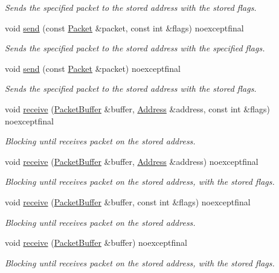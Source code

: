 \begin{DoxyCompactItemize}
\begin{DoxyCompactList}\small\item\em Sends the specified packet to the stored address with the stored flags. \end{DoxyCompactList}\item 
void \hyperlink{classtnnf_1_1_tcp_socket_adb529ca692b31b0154dc5d007d4129f9}{send} (const \hyperlink{classtnnf_1_1_packet}{Packet} \&packet, const int \&flags) noexceptfinal
\begin{DoxyCompactList}\small\item\em Sends the specified packet to the stored address with the specified flags. \end{DoxyCompactList}\item 
void \hyperlink{classtnnf_1_1_tcp_socket_a69f6fe0ca7e90ddfdcbd894056baed88}{send} (const \hyperlink{classtnnf_1_1_packet}{Packet} \&packet) noexceptfinal
\begin{DoxyCompactList}\small\item\em Sends the specified packet to the stored address with the stored flags. \end{DoxyCompactList}\item 
void \hyperlink{classtnnf_1_1_tcp_socket_ae713b6c9c9552af781989ec5382158d5}{receive} (\hyperlink{classtnnf_1_1_packet_buffer}{Packet\+Buffer} \&buffer, \hyperlink{classtnnf_1_1_address}{Address} \&address, const int \&flags) noexceptfinal
\begin{DoxyCompactList}\small\item\em Blocking until receives packet on the stored address. \end{DoxyCompactList}\item 
void \hyperlink{classtnnf_1_1_tcp_socket_aedbff0b4f5512742642a648712d93e7f}{receive} (\hyperlink{classtnnf_1_1_packet_buffer}{Packet\+Buffer} \&buffer, \hyperlink{classtnnf_1_1_address}{Address} \&address) noexceptfinal
\begin{DoxyCompactList}\small\item\em Blocking until receives packet on the stored address, with the stored flags. \end{DoxyCompactList}\item 
void \hyperlink{classtnnf_1_1_tcp_socket_a05fc003226288073314f52e3ee259119}{receive} (\hyperlink{classtnnf_1_1_packet_buffer}{Packet\+Buffer} \&buffer, const int \&flags) noexceptfinal
\begin{DoxyCompactList}\small\item\em Blocking until receives packet on the stored address. \end{DoxyCompactList}\item 
void \hyperlink{classtnnf_1_1_tcp_socket_a4a98e65e8a569cf8a21fa2f7d0e6a7db}{receive} (\hyperlink{classtnnf_1_1_packet_buffer}{Packet\+Buffer} \&buffer) noexceptfinal
\begin{DoxyCompactList}\small\item\em Blocking until receives packet on the stored address, with the stored flags. \end{DoxyCompactList}\end{DoxyCompactItemize}
